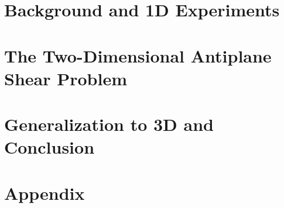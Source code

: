 
\addtolength{\evensidemargin}{-12mm}

%
%

\part[Background and 1D Experiments]{Background and 1D Experiments}
\label{part:introAndBackgroundTheory}


\part[The Two-Dimensional Antiplane Shear Problem]{The Two-Dimensional Antiplane Shear Problem}
\label{part:body}




\part[Generalization to 3D and Conclusion]{Generalization to 3D and Conclusion}
\label{part:resultsAndConclusion}



%
%
\part*{Appendix}

\appendix %




\printglossaries



